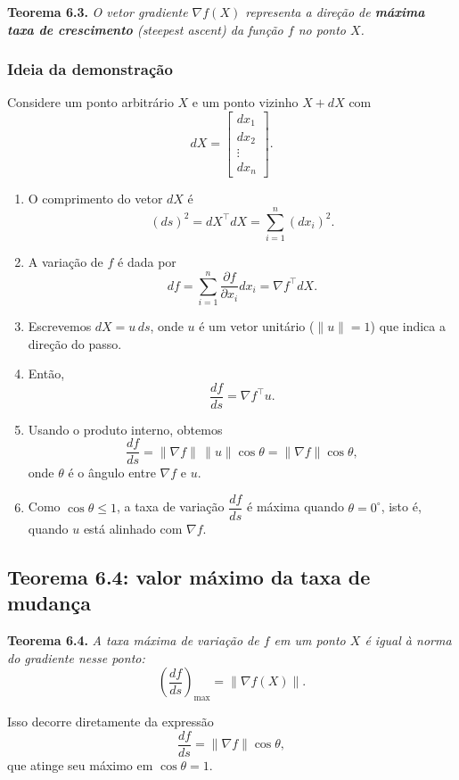 \documentclass[9pt,a4paper]{extarticle}
\begin{document}
\textbf{Teorema 6.3.} \emph{O vetor gradiente $\nabla f(X)$ representa a direção de \textbf{máxima taxa de crescimento} (steepest ascent) da função $f$ no ponto $X$.}

\subsubsection*{Ideia da demonstração}

Considere um ponto arbitrário $X$ e um ponto vizinho $X + dX$ com
\[
  dX =
  \begin{bmatrix}
    dx_1 \\ dx_2 \\ \vdots \\ dx_n
  \end{bmatrix}.
\]

\begin{enumerate}[label=(\alph*)]
    \item O comprimento do vetor $dX$ é
    \[
      (ds)^2 = dX^\top dX = \sum_{i=1}^n (dx_i)^2.
    \]
    \item A variação de $f$ é dada por
    \[
      df = \sum_{i=1}^n \frac{\partial f}{\partial x_i} dx_i = \nabla f^\top dX.
    \]
    \item Escrevemos $dX = u\,ds$, onde $u$ é um vetor unitário ($\|u\|=1$) que indica a direção do passo.
    \item Então,
    \[
      \frac{df}{ds} = \nabla f^\top u.
    \]
    \item Usando o produto interno, obtemos
    \[
      \frac{df}{ds} = \|\nabla f\| \,\|u\| \cos\theta = \|\nabla f\| \cos\theta,
    \]
    onde $\theta$ é o ângulo entre $\nabla f$ e $u$.
    \item Como $\cos\theta \leq 1$, a taxa de variação $\dfrac{df}{ds}$ é máxima quando $\theta = 0^\circ$, isto é, quando $u$ está alinhado com $\nabla f$.
\end{enumerate}

\subsection{Teorema 6.4: valor máximo da taxa de mudança}

\textbf{Teorema 6.4.} \emph{A taxa máxima de variação de $f$ em um ponto $X$ é igual à norma do gradiente nesse ponto:}
\[
  \left(\frac{df}{ds}\right)_{\max} = \|\nabla f(X)\|.
\]

\noindent Isso decorre diretamente da expressão
\[
  \frac{df}{ds} = \|\nabla f\| \cos\theta,
\]
que atinge seu máximo em $\cos\theta = 1$.
\end{document}
